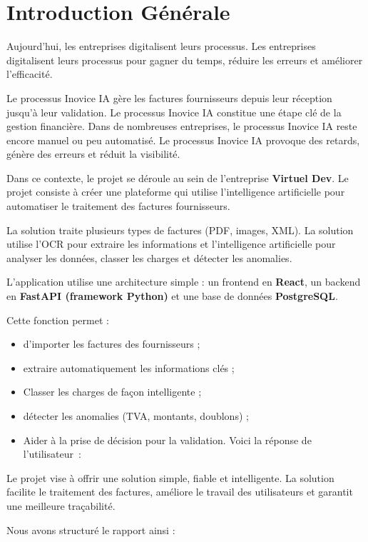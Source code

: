 \chapter*{Introduction Générale}

Aujourd'hui, les entreprises digitalisent leurs processus. Les entreprises digitalisent leurs processus pour gagner du temps, réduire les erreurs et améliorer l'efficacité.

Le processus Inovice IA gère les factures fournisseurs depuis leur réception jusqu’à leur validation. Le processus Inovice IA constitue une étape clé de la gestion financière. Dans de nombreuses entreprises, le processus Inovice IA reste encore manuel ou peu automatisé. Le processus Inovice IA provoque des retards, génère des erreurs et réduit la visibilité.

Dans ce contexte, le projet se déroule au sein de l’entreprise \textbf{Virtuel Dev}. Le projet consiste à créer une plateforme qui utilise l’intelligence artificielle pour automatiser le traitement des factures fournisseurs.

La solution traite plusieurs types de factures (PDF, images, XML). La solution utilise l’OCR pour extraire les informations et l’intelligence artificielle pour analyser les données, classer les charges et détecter les anomalies.

L’application utilise une architecture simple : un frontend en \textbf{React}, un backend en \textbf{FastAPI (framework Python)} et une base de données \textbf{PostgreSQL}.

Cette fonction permet :
\begin{itemize}
\item d’importer les factures des fournisseurs ;
\item extraire automatiquement les informations clés ;
\item Classer les charges de façon intelligente ;
\item détecter les anomalies (TVA, montants, doublons) ;
\item Aider à la prise de décision pour la validation.
Voici la réponse de l'utilisateur :

\end{itemize}

Le projet vise à offrir une solution simple, fiable et intelligente. La solution facilite le traitement des factures, améliore le travail des utilisateurs et garantit une meilleure traçabilité.

Nous avons structuré le rapport ainsi :

